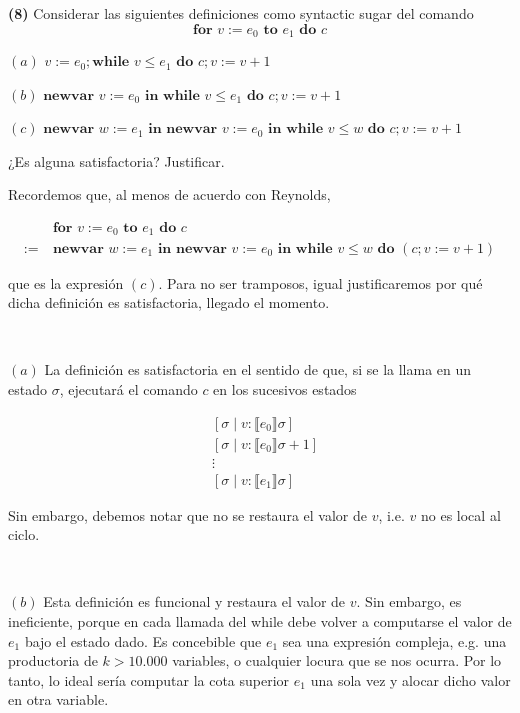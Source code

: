 \documentclass[a4paper, 12pt]{article}
\begin{document}
\pagebreak 

\begin{myframe}
  \textbf{(8)} Considerar las siguientes definiciones como syntactic sugar del
  comando $$\textbf{for } v := e_0 \textbf{ to } e_1 \textbf{ do } c$$

  $(a)$ $v := e_0; \textbf{while } v \leq e_1 \textbf{ do } c; v := v + 1$

  $(b)$ $\textbf{newvar } v := e_0 \textbf{ in } \textbf{while } v \leq e_1
  \textbf{ do } c; v := v+1$

  $(c)$ $\textbf{newvar } w := e_1 \textbf{ in newvar } v := e_0 \textbf{ in
  while } v \leq w \textbf{ do } c; v := v+1$

  ¿Es alguna satisfactoria? Justificar.
\end{myframe}

Recordemos que, al menos de acuerdo con Reynolds,

\begin{align*}
  &\textbf{for } v := e_0 \textbf{ to } e_1 \textbf{ do } c \\ 
  := ~ &\textbf{newvar } w := e_1 \textbf{ in newvar } v:= e_0 \textbf{ in while
  } v \leq w \textbf{ do } (c; v := v+1)
\end{align*}

que es la expresión $(c)$. Para no ser tramposos, igual justificaremos por qué
dicha definición es satisfactoria, llegado el momento.

~ 

$(a)$ La definición es satisfactoria en el sentido de que, si se la llama en un
estado $\sigma$, ejecutará el comando
$c$ en los sucesivos estados 

\begin{align*}
  &[\sigma \mid v : \llbracket e_0 \rrbracket\sigma]\\ 
  &[\sigma \mid v : \llbracket e_0 \rrbracket\sigma + 1]\\
  &\vdots\\
  &[\sigma \mid v : \llbracket e_1 \rrbracket\sigma]
\end{align*}

Sin embargo, debemos notar que no se restaura el valor de $v$, i.e. $v$ no es
local al ciclo.

~

$(b)$ Esta definición es funcional y restaura el valor de $v$. Sin embargo, es
ineficiente, porque en cada llamada del while debe volver a computarse el valor
de $e_1$ bajo el estado dado. Es concebible que $e_1$ sea una expresión
compleja, e.g. una productoria de $k > 10.000$ variables, o cualquier locura que
se nos ocurra. Por lo tanto, lo ideal sería computar la cota superior $e_1$ una
sola vez y alocar dicho valor en otra variable.
\end{document}

